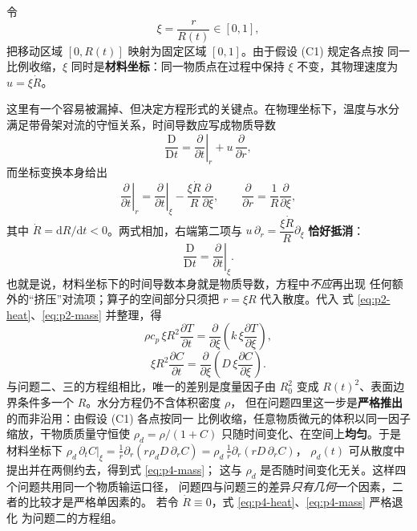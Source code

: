 \documentclass[12pt,a4paper,fontset=none]{ctexart}
\begin{document}
令
\begin{equation}
  \xi=\frac{r}{R(t)}\in[0,1],
\end{equation}
把移动区域 $[0,R(t)]$ 映射为固定区域 $[0,1]$。由于假设 (C1) 规定各点按
同一比例收缩，$\xi$ 同时是\textbf{材料坐标}：同一物质点在过程中保持
$\xi$ 不变，其物理速度为 $u=\xi\dot R$。

这里有一个容易被漏掉、但决定方程形式的关键点。在物理坐标下，温度与水分
满足带骨架对流的守恒关系，时间导数应写成物质导数
\begin{equation}
  \frac{\mathrm{D}}{\mathrm{D}t}
  =\left.\frac{\partial}{\partial t}\right|_{r}
   +u\,\frac{\partial}{\partial r},
  \label{eq:p4-material-deriv}
\end{equation}
而坐标变换本身给出
\begin{equation}
  \left.\frac{\partial}{\partial t}\right|_{r}
  =\left.\frac{\partial}{\partial t}\right|_{\xi}
   -\frac{\xi\dot R}{R}\frac{\partial}{\partial\xi},
  \qquad
  \frac{\partial}{\partial r}=\frac{1}{R}\frac{\partial}{\partial\xi},
  \label{eq:p4-transform}
\end{equation}
其中 $\dot R=\mathrm{d}R/\mathrm{d}t<0$。两式相加，右端第二项与
$u\,\partial_r=\dfrac{\xi\dot R}{R}\partial_\xi$ \textbf{恰好抵消}：
\begin{equation}
  \frac{\mathrm{D}}{\mathrm{D}t}
  =\left.\frac{\partial}{\partial t}\right|_{\xi}.
  \label{eq:p4-cancel}
\end{equation}
也就是说，材料坐标下的时间导数本身就是物质导数，方程中\emph{不应}再出现
任何额外的“挤压”对流项；算子的空间部分只须把 $r=\xi R$ 代入散度。代入
式 \eqref{eq:p2-heat}、\eqref{eq:p2-mass} 并整理，得
\begin{equation}
  \rho c_p\,\xi R^2\frac{\partial T}{\partial t}
  =\frac{\partial}{\partial\xi}
   \left(k\,\xi\frac{\partial T}{\partial\xi}\right),
  \label{eq:p4-heat}
\end{equation}
\begin{equation}
  \xi R^2\frac{\partial C}{\partial t}
  =\frac{\partial}{\partial\xi}
   \left(D\,\xi\frac{\partial C}{\partial\xi}\right).
  \label{eq:p4-mass}
\end{equation}
与问题二、三的方程组相比，唯一的差别是度量因子由 $R_0^2$ 变成
$R(t)^2$、表面边界条件多一个 $R$。水分方程仍不含体积密度 $\rho$，
但在问题四里这一步是\textbf{严格推出}的而非沿用：由假设 (C1) 各点按同一
比例收缩，任意物质微元的体积以同一因子缩放，干物质质量守恒使
$\rho_d=\rho/(1+C)$ 只随时间变化、在空间上\textbf{均匀}。于是材料坐标下
$\rho_d\,\partial_tC|_\xi=\frac1r\partial_r\!\left(r\rho_dD\,\partial_rC
\right)=\rho_d\,\frac1r\partial_r\!\left(rD\,\partial_rC\right)$，
$\rho_d(t)$ 可从散度中提出并在两侧约去，得到式 \eqref{eq:p4-mass}；
这与 $\rho_d$ 是否随时间变化无关。这样四个问题共用同一个物质输运口径，
问题四与问题三的差异\emph{只有几何}一个因素，二者的比较才是严格单因素的。
若令 $\dot R\equiv0$，式 \eqref{eq:p4-heat}、\eqref{eq:p4-mass} 严格退化
为问题二的方程组。
\end{document}
